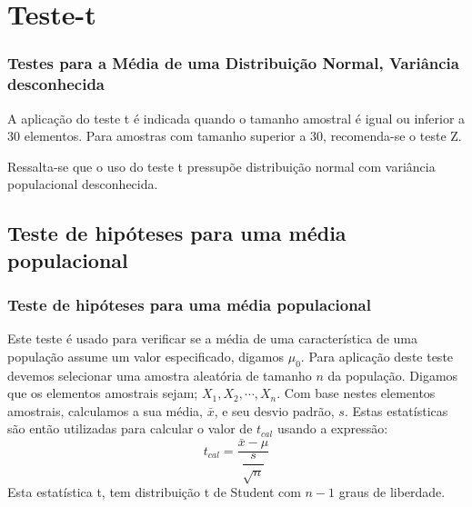 \documentclass[14pt,aspectratio=1610]{beamer}
\newcommand{\bx}{\ensuremath{\bar{x}}}
\begin{document}
\section{Teste-t}
\begin{frame}{}
\frametitle{Testes para a Média de uma Distribuição Normal, Variância desconhecida}
\begin{block}{}
\justifying
A aplicação do teste t é indicada quando o tamanho amostral é igual ou inferior a 30 elementos. Para amostras com tamanho superior a 30, recomenda-se o teste Z. 
\end{block}
\pause
\begin{block}{}
\justifying
Ressalta-se que o uso do teste t pressupõe distribuição normal com variância populacional desconhecida. 
\end{block}
\end{frame}

\subsection{Teste de hipóteses para uma média populacional}
\begin{frame}{}
\frametitle{Teste de hipóteses para uma média populacional}
\begin{block}{}
\justifying
Este teste é usado para verificar se a média de uma característica de uma população assume um valor especificado, 
digamos $\mu_{0}$. Para aplicação deste teste devemos selecionar uma amostra aleatória de tamanho $n$ da população. 
Digamos que os elementos amostrais sejam; $X_{1},X_{2},\cdots,X_{n}.$ Com base nestes elementos amostrais, 
calculamos a sua média, $\bx$, e seu desvio padrão, $s$. Estas estatísticas são então utilizadas para calcular o valor de $t_{cal}$ 
usando a expressão:
$$t_{cal}=\dfrac{\bx-\mu}{\dfrac{s}{\sqrt{n}}}$$
Esta estatística t, tem distribuição t de Student com $n-1$ graus de liberdade. 
\end{block}
\end{frame}
\end{document}
